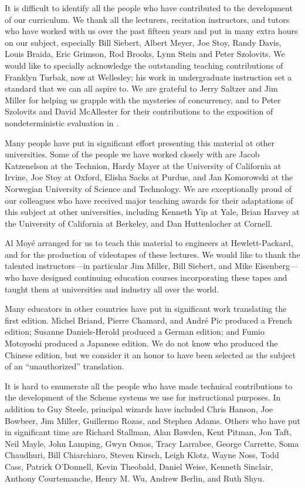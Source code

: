 It is difficult to identify all the people who have contributed to the
development of our curriculum.  We thank all the lecturers, recitation
instructors, and tutors who have worked with us over the past fifteen years and
put in many extra hours on our subject, especially Bill Siebert, Albert Meyer,
Joe Stoy, Randy Davis, Louis Braida, Eric Grimson, Rod Brooks, Lynn Stein and
Peter Szolovits.  We would like to specially acknowledge the outstanding
teaching contributions of Franklyn Turbak, now at Wellesley; his work in
undergraduate instruction set a standard that we can all aspire to.  We are
grateful to Jerry Saltzer and Jim Miller for helping us grapple with the
mysteries of concurrency, and to Peter Szolovits and David McAllester for their
contributions to the exposition of nondeterministic evaluation in .

Many people have put in significant effort presenting this material at other
universities.  Some of the people we have worked closely with are Jacob
Katzenelson at the Technion, Hardy Mayer at the University of California at
Irvine, Joe Stoy at Oxford, Elisha Sacks at Purdue, and Jan Komorowski at the
Norwegian University of Science and Technology.  We are exceptionally proud of
our colleagues who have received major teaching awards for their adaptations of
this subject at other universities, including Kenneth Yip at Yale, Brian Harvey
at the University of California at Berkeley, and Dan Huttenlocher at Cornell.

Al Moy\'e arranged for us to teach this material to engineers at
Hewlett-Packard, and for the production of videotapes of these lectures.  We
would like to thank the talented instructors---in particular Jim Miller, Bill
Siebert, and Mike Eisenberg---who have designed continuing education courses
incorporating these tapes and taught them at universities and industry all over
the world.

Many educators in other countries have put in significant work translating the
first edition.  Michel Briand, Pierre Chamard, and Andr\'e Pic produced a
French edition; Susanne Daniels-Herold produced a German edition; and Fumio
Motoyoshi produced a Japanese edition.  We do not know who produced the Chinese
edition, but we consider it an honor to have been selected as the subject of an
``unauthorized'' translation.

It is hard to enumerate all the people who have made technical contributions to
the development of the Scheme systems we use for instructional purposes.  In
addition to Guy Steele, principal wizards have included Chris Hanson, Joe
Bowbeer, Jim Miller, Guillermo Rozas, and Stephen Adams.  Others who have put
in significant time are Richard Stallman, Alan Bawden, Kent Pitman, Jon Taft,
Neil Mayle, John Lamping, Gwyn Osnos, Tracy Larrabee, George Carrette, Soma
Chaudhuri, Bill Chiarchiaro, Steven Kirsch, Leigh Klotz, Wayne Noss, Todd Cass,
Patrick O'Donnell, Kevin Theobald, Daniel Weise, Kenneth Sinclair, Anthony
Courtemanche, Henry M. Wu, Andrew Berlin, and Ruth Shyu.

